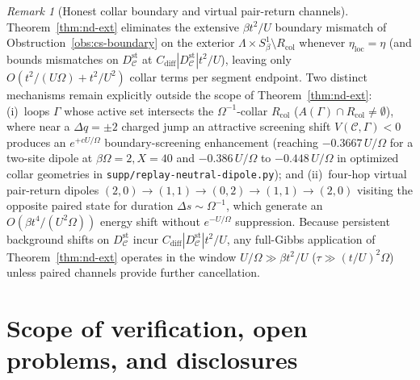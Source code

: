 \documentclass[11pt]{article}
\theoremstyle{definition}
\theoremstyle{remark}
\newtheorem{remark}[theorem]{Remark}
\begin{document}
\begin{remark}[Honest collar boundary and virtual pair-return channels]
\label{rem:nd-scope}
Theorem~\ref{thm:nd-ext} eliminates the extensive $\beta t^2/U$ boundary mismatch
of Obstruction~\ref{obs:cs-boundary} on the exterior $\Lambda \times S^1_\beta \setminus R_{\mathrm{col}}$
whenever $\eta_{\mathrm{loc}} = \eta$ (and bounds mismatches on $D_{\mathcal{C}}^{\mathrm{st}}$
at $C_{\mathrm{diff}} |D_{\mathcal{C}}^{\mathrm{st}}| t^2/U$), leaving only
$O(t^2/(U\Omega) + t^2/U^2)$ collar terms per segment endpoint. Two distinct
mechanisms remain explicitly outside the scope of Theorem~\ref{thm:nd-ext}:
(i)~loops $\Gamma$ whose active set intersects the $\Omega^{-1}$-collar
$R_{\mathrm{col}}$ ($A(\Gamma) \cap R_{\mathrm{col}} \ne \emptyset$), where
near a $\Delta q = \pm 2$ charged jump an attractive screening shift
$V(\mathcal{C},\Gamma) < 0$ produces an $e^{+c U/\Omega}$ boundary-screening
enhancement (reaching $-0.3667\, U/\Omega$ for a two-site dipole at $\beta\Omega=2, X=40$
and $-0.386\, U/\Omega$ to $-0.448\, U/\Omega$ in optimized collar geometries
in \texttt{supp/replay-neutral-dipole.py}); and (ii)~four-hop virtual
pair-return dipoles $(2,0) \to (1,1) \to (0,2) \to (1,1) \to (2,0)$ visiting
the opposite paired state for duration $\Delta s \sim \Omega^{-1}$, which
generate an $O(\beta t^4/(U^2\Omega))$ energy shift without $e^{-U/\Omega}$
suppression. Because persistent background shifts on $D_{\mathcal{C}}^{\mathrm{st}}$
incur $C_{\mathrm{diff}} |D_{\mathcal{C}}^{\mathrm{st}}| t^2/U$, any full-Gibbs
application of Theorem~\ref{thm:nd-ext} operates in the window $U/\Omega \gg \beta t^2/U$
($\tau \gg (t/U)^2 \Omega$) unless paired channels provide further cancellation.
\end{remark}
 
\section{Scope of verification, open problems, and disclosures}
\label{sec:scope}
 
\end{document}

